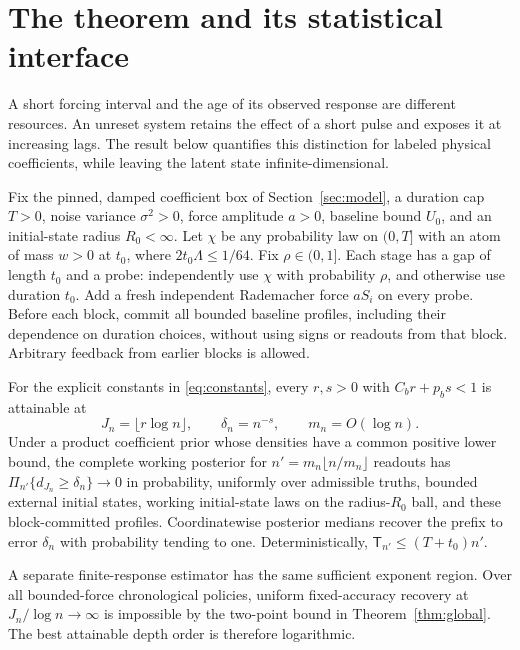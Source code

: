 \section{The theorem and its statistical interface}
A short forcing interval and the age of its observed response are different
resources. An unreset system retains the effect of a short pulse and exposes
it at increasing lags. The result below quantifies this distinction for labeled
physical coefficients, while leaving the latent state infinite-dimensional.

\begin{theorem}
\label{thm:main}
Fix the pinned, damped coefficient box of Section~\ref{sec:model}, a duration
cap $T>0$, noise variance $\sigma^2>0$, force amplitude $a>0$, baseline bound
$U_0$, and an initial-state radius $R_0<\infty$. Let $\chi$ be any probability
law on $(0,T]$ with an atom of mass $w>0$ at $t_0$, where
$2t_0\Lambda\le1/64$. Fix $\rho\in(0,1]$. Each stage has a gap of length
$t_0$ and a probe: independently use $\chi$ with probability $\rho$, and
otherwise use duration $t_0$. Add a fresh independent Rademacher force
$aS_i$ on every probe. Before each block, commit all bounded baseline profiles,
including their dependence on duration choices, without using signs or readouts
from that block. Arbitrary feedback from earlier blocks is allowed.

For the explicit constants in \eqref{eq:constants}, every $r,s>0$ with
$C_b r+p_b s<1$ is attainable at
\[
 J_n=\lfloor r\log n\rfloor,\qquad \delta_n=n^{-s},\qquad m_n=O(\log n).
\]
Under a product coefficient prior whose densities have a common positive lower
bound, the complete working posterior for $n'=m_n\lfloor n/m_n\rfloor$
readouts has $\Pi_{n'}\{d_{J_n}\ge\delta_n\}\to0$ in probability, uniformly
over admissible truths, bounded external initial states, working initial-state
laws on the radius-$R_0$ ball, and these block-committed profiles. Coordinatewise
posterior medians recover the prefix to error $\delta_n$ with probability tending
to one. Deterministically, $\mathsf T_{n'}\le(T+t_0)n'$.

A separate finite-response estimator has the same sufficient exponent region.
Over all bounded-force chronological policies, uniform fixed-accuracy recovery
at $J_n/\log n\to\infty$ is impossible by the two-point bound in
Theorem~\ref{thm:global}. The best attainable depth order is therefore logarithmic.
\end{theorem}

